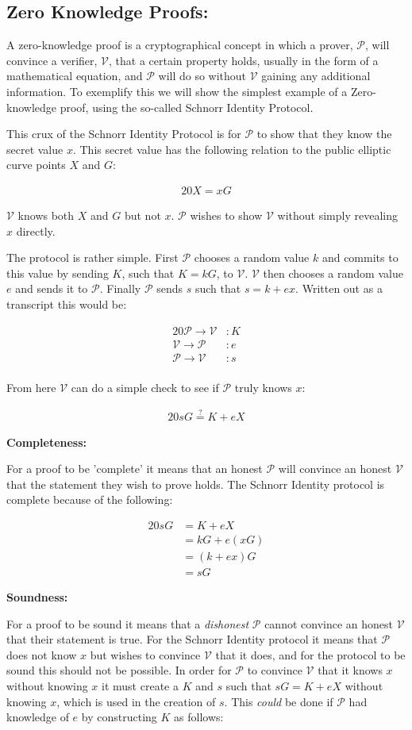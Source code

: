 \documentclass{article}
\newcommand{\eq}[1]{\begin{alignat*}{20}#1\end{alignat*}}
\newcommand{\V}{\mathcal{V}}
\renewcommand{\P}{\mathcal{P}}
\begin{document}
\subsection{Zero Knowledge Proofs:}\label{zero-knowledge}

A zero-knowledge proof is a cryptographical concept in which a prover,
$\P$, will convince a verifier, $\V$, that a certain property holds,
usually in the form of a mathematical equation, and $\P$ will do so
without $\V$ gaining any additional information. To exemplify this we
will show the simplest example of a Zero-knowledge proof, using the
so-called Schnorr Identity Protocol.

This crux of the Schnorr Identity Protocol is for $\P$ to show that
they know the secret value $x$. This secret value has the following
relation to the public elliptic curve points $X$ and $G$:

\eq{
	X = xG
}

$\V$ knows both $X$ and $G$ but not $x$. $\P$ wishes to show $\V$
without simply revealing $x$ directly.

The protocol is rather simple. First $\P$ chooses a random value $k$ and commits
to this value by sending $K$, such that $K = kG$, to $\V$. $\V$ then
chooses a random value $e$ and sends it to $\P$. Finally $\P$ sends $s$
such that $s = k + ex$. Written out as a transcript this would be:

\eq{
	\P \rightarrow \V &: K \\
	\V \rightarrow \P &: e \\
	\P \rightarrow \V &: s \\
}

From here $\V$ can do a simple check to see if $\P$ truly knows $x$:

\eq{
	sG \stackrel{?}{=} K + eX
}


\textbf{Completeness:}

For a proof to be 'complete' it means that an honest $\P$ will convince
an honest $\V$ that the statement they wish to prove holds. The Schnorr 
Identity protocol is complete because of the following:

\eq{
	sG &= K + eX \\
	   &= kG + e(xG) \\
	   &= (k + ex)G \\
	   &= sG
}

\textbf{Soundness:}

For a proof to be sound it means that a \textit{dishonest} $\P$
cannot convince an honest $\V$ that their statement is true. For the 
Schnorr Identity protocol it means that $\P$ does not know $x$ 
but wishes to convince $\V$ that it does, and for the protocol to be 
sound this should not be possible. In order for $\P$ to convince $\V$ 
that it knows $x$ without knowing $x$ it must create a $K$ and $s$ 
such that $sG = K + eX$ without knowing $x$, which is used in the 
creation of $s$. This \textit{could} be done if $\P$ had knowledge of 
$e$ by constructing $K$ as follows:
\end{document}
